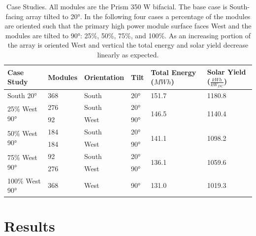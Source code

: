 \documentclass[journal,article,submit,pdftex,moreauthors]{Definitions/mdpi}
\begin{document}
\begin{table}
  \centering
  \caption{Case Studies. All modules are the Prism 350 W
  bifacial. The base case is South-facing array tilted to 20°. In the
  following four cases a percentage of the modules are oriented such that
  the primary high power module surface faces West and the modules are
  tilted to 90°: 25\%, 50\%, 75\%, and 100\%. As an increasing portion of
  the array is oriented West and vertical the total energy and solar yield
  decrease linearly as expected.}
  \label{tab:casestudies}
  \begin{tabularx}{\textwidth}{XXXXXX}
  \toprule
  Case Study                      & Modules     & Orientation & Tilt  & Total Energy ($MWh$)        & Solar Yield ($\frac{kWh}{kW_{DC}}$) \\
  \midrule
  South 20°                       & 368         & South       & 20°   & 151.7                       & 1180.8\\
  \hline
  \multirow{2}{*}{25\% West 90°}  & 276         & South       & 20°   &\multirow{2}{*}{146.5}       & \multirow{2}{*}{1140.4}\\
                                  & 92          & West        & 90°   &                             &                         \\
  \hline
  \multirow{2}{*}{50\% West 90°}  & 184         & South       & 20°   & \multirow{2}{*}{141.1}      & \multirow{2}{*}{1098.2}\\
                                  & 184         & West        & 90°   &                             & \\                              
  \hline                                  
  \multirow{2}{*}{75\% West 90°}  & 92          & South       & 20°   & \multirow{2}{*}{136.1}      & \multirow{2}{*}{1059.6}\\
                                  & 276         & West        & 90°   &                             & \\                       
  \hline
  100\% West 90°                  & 368         & West        & 90°   & 131.0                       & 1019.3 \\                                                                              
  \bottomrule
  \end{tabularx}
\end{table}

\section{Results}\label{results}%
\end{document}
